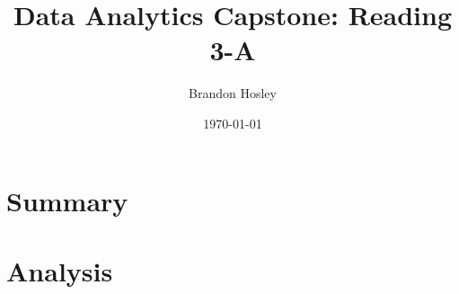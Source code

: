 \documentclass[]{article}
\title{Data Analytics Capstone: Reading 3-A}
\author{Brandon Hosley}
\date{\today}
\begin{document}
	\maketitle
	
\section{Summary} 

\cite{Sculley2015} 


\section{Analysis}



\clearpage


\end{document}
